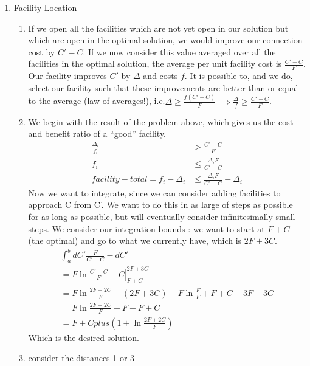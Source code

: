 \documentclass[a4paper]{article}
\begin{document}
\begin{enumerate}
\item Facility Location
	\begin{enumerate}
		\item If we open all the facilities which are not yet open in our solution but which are open in the optimal solution, we would improve our connection cost by $C' - C$.  If we now consider this value averaged over all the facilities in the optimal solution, the average per unit facility cost is $\frac{C' - C}{F}$.  Our facility improves $C'$ by $\Delta$ and costs $f$.  It is possible to, and we do, select our facility such that these improvements are better than or equal to the average (law of averages!), i.e.$\Delta \geq \frac{f(C' - C)}{F} \implies \frac{\Delta}{f} \geq \frac{C' - C}{F}$.
		\item We begin with the result of the problem above, which gives us the cost and benefit ratio of a ``good'' facility.
			\begin{align}
				\frac{\Delta_i}{f_i} &\geq \frac{C' - C}{F} \\
				f_i &\leq \frac{\Delta_i F}{C' - C} \\
				facility-total = f_i - \Delta_i &\leq \frac{\Delta_i F}{C' - C} - \Delta_i
			\end{align}
			Now we want to integrate, since we can consider adding facilities to approach C from C'.  We want to do this in as large of steps as possible for as long as possible, but will eventually consider infinitesimally small steps.  We consider our integration bounds : we want to start at $F+C$ (the optimal) and go to what we currently have, which is $2F+3C$.
			\begin{align}
				\int_a^b{dC' \frac{F}{C' - C} - dC'} \\
				= \left. F\ln \frac{C' - C}{F} - C \right|_{F+C}^{2F+3C} \\
				= F \ln \frac{2F + 2C}{F} - (2F + 3C) - F \ln \frac{F}{F} + F + C+ 3F + 3C \\
				= F \ln \frac{2F + 2C}{F} + F + F + C \\
				= F + C plus (1+\ln\frac{2F + 2C}{F})
			\end{align}
			Which is the desired solution.
		\item consider the distances 1 or 3
	\end{enumerate}


\end{enumerate}
\end{document}
